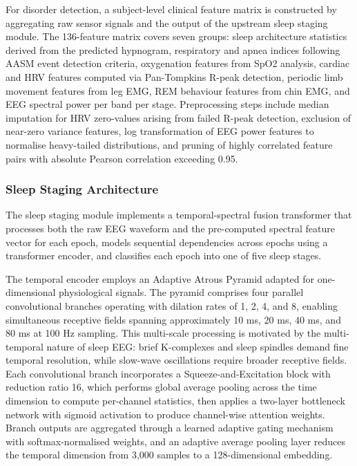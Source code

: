 For disorder detection, a subject-level clinical feature matrix is constructed by aggregating raw sensor signals and the output of the upstream sleep staging module. The 136-feature matrix covers seven groups: sleep architecture statistics derived from the predicted hypnogram, respiratory and apnea indices following AASM event detection criteria, oxygenation features from SpO2 analysis, cardiac and HRV features computed via Pan-Tompkins R-peak detection, periodic limb movement features from leg EMG, REM behaviour features from chin EMG, and EEG spectral power per band per stage. Preprocessing steps include median imputation for HRV zero-values arising from failed R-peak detection, exclusion of near-zero variance features, log transformation of EEG power features to normalise heavy-tailed distributions, and pruning of highly correlated feature pairs with absolute Pearson correlation exceeding 0.95.

\subsubsection{Sleep Staging Architecture}

The sleep staging module implements a temporal-spectral fusion transformer that processes both the raw EEG waveform and the pre-computed spectral feature vector for each epoch, models sequential dependencies across epochs using a transformer encoder, and classifies each epoch into one of five sleep stages.

The temporal encoder employs an Adaptive Atrous Pyramid \cite{sun2025adg} adapted for one-dimensional physiological signals. The pyramid comprises four parallel convolutional branches operating with dilation rates of 1, 2, 4, and 8, enabling simultaneous receptive fields spanning approximately 10 ms, 20 ms, 40 ms, and 80 ms at 100 Hz sampling. This multi-scale processing is motivated by the multi-temporal nature of sleep EEG: brief K-complexes and sleep spindles demand fine temporal resolution, while slow-wave oscillations require broader receptive fields. Each convolutional branch incorporates a Squeeze-and-Excitation block \cite{hu2018senet} with reduction ratio 16, which performs global average pooling across the time dimension to compute per-channel statistics, then applies a two-layer bottleneck network with sigmoid activation to produce channel-wise attention weights. Branch outputs are aggregated through a learned adaptive gating mechanism with softmax-normalised weights, and an adaptive average pooling layer reduces the temporal dimension from 3,000 samples to a 128-dimensional embedding.

